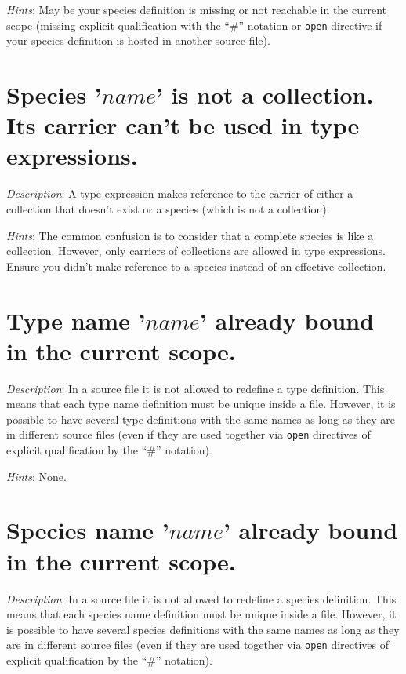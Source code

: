 {\em Hints}: May be your species definition is missing or not
reachable in the current scope (missing explicit qualification with
the ``\#'' notation or {\tt open} directive if your species definition is
hosted in another source file).



\section*{Species '$name$' is not a collection. Its carrier can't be used in type expressions.}
{\em Description}: A type expression makes reference to the carrier of
either a collection that doesn't exist or a species (which is not a
collection).

{\em Hints}: The common confusion is to consider that a complete species
is like a collection. However, only carriers of collections are allowed
in type expressions. Ensure you didn't make reference to a species instead
of an effective collection.



\section*{Type name '$name$' already bound in the current scope.}
{\em Description}: In a source file it is not allowed to redefine a
type definition. This means that each type name definition must be
unique inside a file. However, it is possible to have several type
definitions with the same names as long as they are in different
source files (even if they are used together via {\tt open} directives
of explicit qualification by the ``\#'' notation).

{\em Hints}: None.



\section*{Species name '$name$' already bound in the current scope.}
{\em Description}: In a source file it is not allowed to redefine a
species definition. This means that each species name definition must
be unique inside a file. However, it is possible to have several species
definitions with the same names as long as they are in different
source files (even if they are used together via {\tt open} directives
of explicit qualification by the ``\#'' notation).


